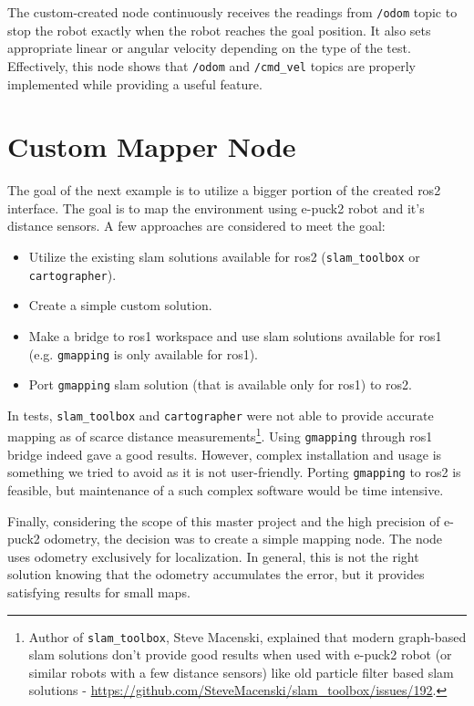 The custom-created node continuously receives the readings from \texttt{/odom} topic to stop the robot exactly when the robot reaches the goal position.
It also sets appropriate linear or angular velocity depending on the type of the test.
Effectively, this node shows that \texttt{/odom} and \texttt{/cmd\_vel} topics are properly implemented while providing a useful feature.

\section{Custom Mapper Node}
\label{sec:demos:mapping}

The goal of the next example is to utilize a bigger portion of the created \ac{ros2} interface.
The goal is to map the environment using e-puck2 robot and it's distance sensors.
A few approaches are considered to meet the goal:
\begin{itemize}
    \item Utilize the existing \ac{slam} solutions available for \ac{ros2} (\texttt{slam\_toolbox} or \texttt{cartographer}).
    \item Create a simple custom solution.
    \item Make a bridge to \ac{ros}1 workspace and use \ac{slam} solutions available for \ac{ros}1 (e.g. \texttt{gmapping} is only available for \ac{ros}1).
    \item Port \texttt{gmapping} \ac{slam} solution (that is available only for \ac{ros}1) to \ac{ros2}.
\end{itemize}

In tests, \texttt{slam\_toolbox} and \texttt{cartographer} were not able to provide accurate mapping as of scarce distance measurements\footnote{Author of \texttt{slam\_toolbox}, Steve Macenski, explained that modern graph-based \ac{slam} solutions don't provide good results when used with e-puck2 robot (or similar robots with a few distance sensors) like old particle filter based \ac{slam} solutions - \url{https://github.com/SteveMacenski/slam_toolbox/issues/192}.}. Using \texttt{gmapping} through \ac{ros}1 bridge indeed gave a good results.
However, complex installation and usage is something we tried to avoid as it is not user-friendly.
Porting \texttt{gmapping} to \ac{ros2} is feasible, but maintenance of a such complex software would be time intensive.

Finally, considering the scope of this master project and the high precision of e-puck2 odometry, the decision was to create a simple mapping node.
The node uses odometry exclusively for localization.
In general, this is not the right solution knowing that the odometry accumulates the error, but it provides satisfying results for small maps. 

